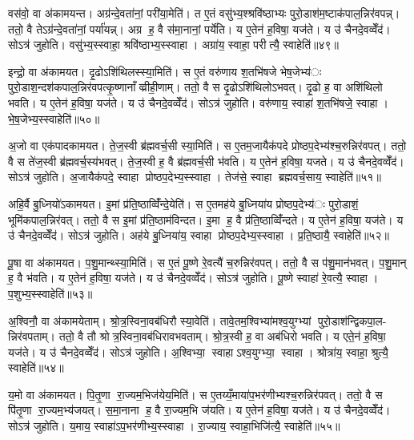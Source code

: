 वस॑वो॒ वा अ॑कामयन्त। अग्र॑न्दे॒वता॑नां॒ परी॑या॒मेति॑। त ए॒तं वसु॑भ्य॒श्श्रवि॑ष्ठाभ्यः पुरो॒डाश॑म॒ष्टाक॑पाल॒न्निर॑वपन्न्। ततो॒ वै तेऽग्र॑न्दे॒वता॑नां॒ पर्या॑यन्न्। अग्र ह॒ वै स॑मा॒नानां॒ पर्ये॑ति। य ए॒तेन॑ ह॒विषा॒ यज॑ते। य उ॑ चैनदे॒वव्वेँद॑। सोऽत्र॑ जुहोति। वसु॑भ्य॒स्स्वाहा॒ श्रवि॑ष्ठाभ्य॒स्स्वाहा। अग्रा॑य॒ स्वाहा॒ परीत्यै॒ स्वाहेति॑॥४९॥

इन्द्रो॒ वा अ॑कामयत। दृ॒ढोऽशि॑थिलस्स्या॒मिति॑। स ए॒तं वरु॑णाय श॒तभि॑षजे भेष॒जेभ्य॑ः पुरो॒डाश॒न्दश॑कपाल॒न्निर॑वपत्कृ॒ष्णानाँव्व्रीही॒णाम्। ततो॒ वै स दृ॒ढोऽशि॑थिलोऽभवत्। दृ॒ढो ह॒ वा अशि॑थिलो भवति। य ए॒तेन॑ ह॒विषा॒ यज॑ते। य उ॑ चैनदे॒वव्वेँद॑। सोऽत्र॑ जुहोति। वरु॑णाय॒ स्वाहा॑ श॒तभि॑षजे॒ स्वाहा। भे॒ष॒जेभ्य॒स्स्वाहेति॑॥५०॥

अ॒जो वा एक॑पादकामयत। ते॒ज॒स्वी ब्र॑ह्मवर्च॒सी स्या॒मिति॑। स ए॒तम॒जायैक॑पदे प्रोष्ठप॒देभ्य॑श्च॒रुन्निर॑वपत्। ततो॒ वै स ते॑ज॒स्वी ब्र॑ह्मवर्च॒स्य॑भवत्। ते॒ज॒स्वी ह॒ वै ब्र॑ह्मवर्च॒सी भ॑वति। य ए॒तेन॑ ह॒विषा॒ यजते। य उ॑ चैनदे॒वव्वेँद॑। सोऽत्र॑ जुहोति। अ॒जायैक॑पदे॒ स्वाहा प्रोष्ठप॒देभ्य॒स्स्वाहा। तेज॑से॒ स्वाहा ब्रह्मवर्च॒साय॒ स्वाहेति॑॥५१॥

अहि॒र्वै बु॒ध्नियो॑ऽकामयत। इ॒मां प्र॑ति॒ष्ठाव्विँ॑न्दे॒येति॑। स ए॒तमह॑ये बु॒ध्निया॑य प्रोष्ठप॒देभ्य॑ः पुरो॒डाशं॒ भूमि॑कपाल॒न्निर॑वत्। ततो॒ वै स इ॒मां प्र॑ति॒ष्ठाम॑विन्दत। इ॒मा ह॒ वै प्र॑ति॒ष्ठाव्विँ॑न्दते। य ए॒तेन॑ ह॒विषा॒ यज॑ते। य उ॑ चैनदे॒वव्वेँद॑। सोऽत्र॑ जुहोति। अह॑ये बु॒ध्निया॑य॒ स्वाहा प्रोष्ठप॒देभ्य॒स्स्वाहा। प्र॒ति॒ष्ठायै॒ स्वाहेति॑॥५२॥

पू॒षा वा अ॑कामयत। प॒शु॒मान्थ्स्या॒मिति॑। स ए॒तं पू॒ष्णे रे॒वत्यै॑ च॒रुन्निर॑वपत्। ततो॒ वै स प॑शु॒मान॑भवत्। प॒शु॒मान् ह॒ वै भ॑वति। य ए॒तेन॑ ह॒विषा॒ यज॑ते। य उ॑ चैनदे॒वव्वेँद॑। सोऽत्र॑ जुहोति। पू॒ष्णे स्वाहा॑ रे॒वत्यै॒ स्वाहा। प॒शुभ्य॒स्स्वाहेति॑॥५३॥

अ॒श्विनौ॒ वा अ॑कामयेताम्। श्रो॒त्र॒स्विना॒वब॑धिरौ स्या॒वेति॑। तावे॒तम॒श्विभ्या॑मश्व॒युग्भ्यां पुरो॒डाश॑न्द्विकपा॒ल- न्निर॑वपताम्। ततो॒ वै तौ श्रोत्र॒स्विना॒वब॑धिरावभवताम्। श्रो॒त्र॒स्वी ह॒ वा अब॑धिरो भवति। य एते॒न॑ ह॒विषा॒ यज॑ते। य उ॑ चैनदे॒वव्वेँद॑। सोऽत्र॑ जुहोति। अ॒श्विभ्या॒ स्वाहाऽश्व॒युग्भ्या॒ स्वाहा। श्रोत्रा॑य॒ स्वाहा॒ श्रुत्यै॒ स्वाहेति॑॥५४॥

य॒मो वा अ॑कामयत। पि॒तृ॒णा रा॒ज्यम॒भिज॑येय॒मिति॑। स ए॒तय्यँ॒माया॑प॒भर॑णीभ्यश्च॒रुन्निर॑पवत्। ततो॒ वै स पि॑तृ॒णा रा॒ज्यम॒भ्य॑जयत्। स॒मा॒नाना ह॒ वै रा॒ज्यम॒भि ज॑यति। य ए॒तेन॑ ह॒विषा॒ यज॑ते। य उ॑ चैनदे॒वव्वेँद॑। सोऽत्र॑ जुहोति। य॒माय॒ स्वाहा॑ऽप॒भर॑णीभ्य॒स्स्वाहा। रा॒ज्याय॒ स्वाहा॒भिजि॑त्यै॒ स्वाहेति॑॥५५॥

